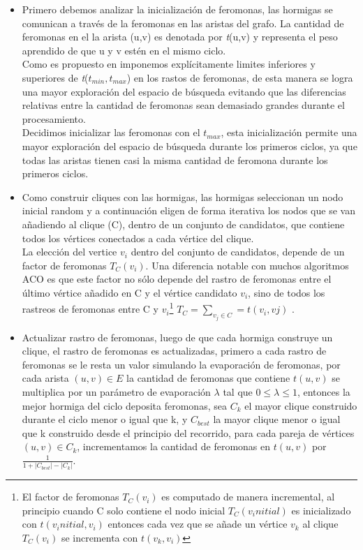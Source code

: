 \documentclass[sn-mathphys,Numbered]{sn-jnl}%
\theoremstyle{thmstyleone}%
\theoremstyle{thmstyletwo}%
\theoremstyle{thmstylethree}%
\begin{document}
\begin{itemize}
    \item Primero debemos analizar la inicializaci\'on de feromonas, las hormigas se comunican a través de la feromonas en las aristas del grafo. La cantidad de feromonas en el la arista (u,v) es denotada por \textit{t}(u,v) y representa el peso aprendido de que u y v estén en el mismo ciclo.\\
    Como es propuesto en \cite{4,5} imponemos explícitamente limites inferiores y superiores de \textit{t}($\textit{t}_{min}, \textit{t}_{max}$) en los rastos de feromonas, de esta manera se logra una mayor exploraci\'on del espacio de b\'usqueda evitando que las diferencias relativas entre la cantidad de feromonas sean demasiado grandes durante el procesamiento.\\
    Decidimos inicializar las feromonas con el $\textit{t}_{max}$, esta inicialización permite una mayor exploración del espacio de búsqueda durante los primeros ciclos, ya que todas las aristas tienen casi la misma cantidad de feromona durante los primeros ciclos\cite{6}.
    \item Como construir cliques con las hormigas, las hormigas seleccionan un nodo inicial random y a continuaci\'on eligen de forma iterativa los nodos que se van a\~nadiendo al clique (C), dentro de un conjunto de candidatos, que contiene todos los vértices conectados a cada vértice del clique.\\
    La elecci\'on del vertice $v_i$ dentro del conjunto de candidatos, depende de un factor de feromonas $\textit{T}_C(v_i)$. Una diferencia notable con muchos algoritmos ACO es que este factor no sólo depende del rastro de feromonas entre el último vértice añadido en C y el vértice candidato $v_i$, sino de todos los rastreos de feromonas entre C y $v_i$\footnote{El factor de feromonas $\textit{T}_C(v_i)$ es computado de manera incremental, al principio cuando C solo contiene el nodo inicial $\textit{T}_C(v_initial)$  es inicializado con $\textit{t}(v_initial,v_i)$ entonces cada vez que se a\~nade un vértice $v_k$ al clique $\textit{T}_C(v_i)$ se incrementa con $\textit{t}(v_k,v_i)$ } $\textit{T}_C = \sum_{v_j \in C} = \textit{t}(v_i,vj)$ \cite{5}.
    \item Actualizar rastro de feromonas, luego de que cada hormiga construye un clique, el rastro de feromonas es actualizadas, primero a cada rastro de feromonas se le resta un valor simulando la evaporación de feromonas, por cada arista $(u,v) \in E $ la cantidad de feromonas que contiene $\textit{t}(u,v)$ se multiplica por un par\'ametro de evaporaci\'on $\lambda$ tal que $0 \leq \lambda \leq 1$, entonces la mejor hormiga del ciclo deposita feromonas, sea $C_k$ el mayor clique construido durante el ciclo menor o igual que k, y $C_{best}$ la mayor clique menor o igual que k construido desde el principio del recorrido, para cada pareja de vértices $(u,v) \in C_k$, incrementamos la cantidad de feromonas en $\textit{t}(u,v)$ por $\frac{1}{1 + |C_{best}| - |C_k|}$.\cite{5}\\
\end{itemize}
\end{document}
